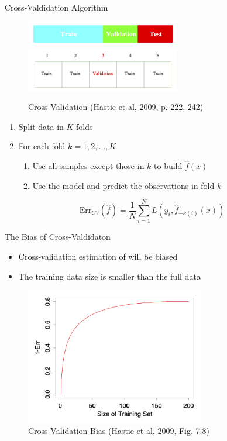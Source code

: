 \documentclass[10pt,handout]{beamer}
\begin{document}
\begin{frame}{Cross-Valdidation Algorithm}

\begin{figure}[h]
\caption{Cross-Validation (Hastie et al, 2009, p. 222, 242)}
\centering
\includegraphics[width=0.6\textwidth]{figs/ESL_test_train_val.png}
\includegraphics[width=0.6\textwidth]{figs/ESL_cross_val.png}
\end{figure}

\begin{enumerate}
\item Split data in $K$ folds
\item For each fold $k=1,2,...,K$
\begin{enumerate}
\item Use all samples except those in $k$ to build $\hat{f}(x)$
\item Use the model and predict the observations in fold $k$
\end{enumerate}
\end{enumerate}

\[
\text{Err}_{CV}(\hat{f}) = \frac{1}{N}\sum^N_{i=1} L(y_i,\hat{f}_{-\kappa(i)}(x))
\]

\end{frame}

\begin{frame}{The Bias of Cross-Valdidaton}

\begin{itemize}
\item Cross-validation estimation of  will be biased
\item The training data size is smaller than the full data
\end{itemize}

\begin{figure}[h]
\caption{Cross-Validation Bias (Hastie et al, 2009, Fig. 7.8)}
\centering
\includegraphics[width=0.7\textwidth]{figs/ESL_7_8.png}
\end{figure}

\end{frame}
\end{document}
